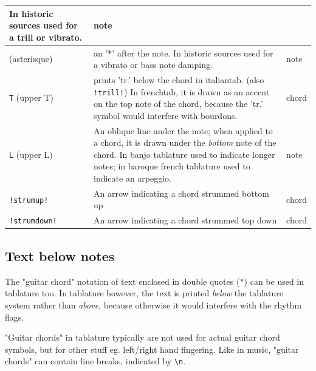 \documentclass[a4paper]{article}
\begin{document}
\begin{center}
\begin{longtable}{|l|p{9cm}|l|}
    In historic sources used for a trill or vibrato. & note \\ \hline
{\tt *} (asterisque) & an '*' after the note. \newline
    In historic sources used for a vibrato or bass note damping. & 
    note \\ \hline
{\tt T} (upper T) & prints 'tr.' below the chord in italiantab. (also \verb$!trill!$)\newline
    In frenchtab, it is drawn as an accent on the top note of the chord,
    because the 'tr.' symbol would interfere with bourdons. & chord \\ \hline
{\tt L} (upper L) & An oblique line under the note; when applied to
    a chord, it is drawn under the {\it bottom} note of the chord.\newline
    In banjo tablature used to indicate longer notes; in baroque
    french tablature used to indicate an arpeggio. & note \\ \hline
{\tt !strumup!} & An arrow indicating a chord strummed bottom up & 
    chord \\ \hline
{\tt !strumdown!} & An arrow indicating a chord strummed top down & 
    chord \\ \hline
\end{longtable}
\end{center}

\subsection{Text below notes}
The "guitar chord" notation of text enclosed in double quotes
({\tt "}) can be used in tablature too. In tablature however, the
text is printed {\it below} the tablature system rather than {\it above},
because otherwise it would interfere with the rhythm flags.
\par
"Guitar chords" in tablature typically are not used for actual
guitar chord symbols, but for other stuff eg. left/right hand fingering.
Like in music, "guitar chords" can contain line breaks,
indicated by \verb$\n$.
\end{document}
